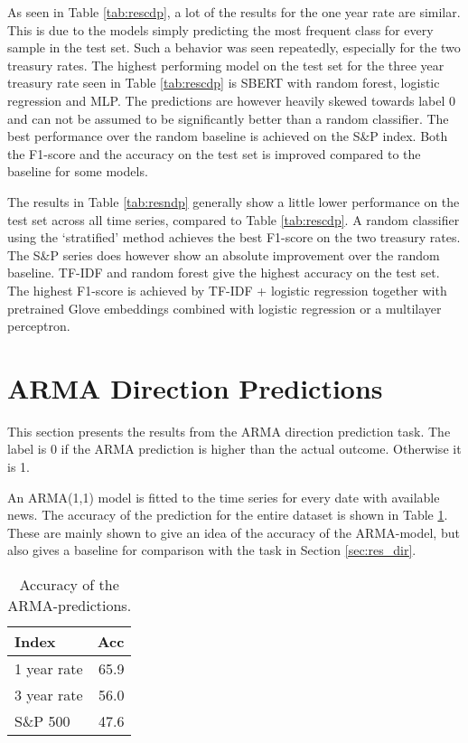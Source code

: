 As seen in Table \ref{tab:rescdp}, a lot of the results for the one year rate are similar. This is due to the models simply predicting the most frequent class for every sample in the test set. Such a behavior was seen repeatedly, especially for the two treasury rates. The highest performing model on the test set for the three year treasury rate seen in Table \ref{tab:rescdp} is SBERT with random forest, logistic regression and MLP. The predictions are however heavily skewed towards label 0 and can not be assumed to be significantly better than a random classifier.
The best performance over the random baseline is achieved on the S\&P index. Both the F1-score and the accuracy on the test set is improved compared to the baseline for some models. 

The results in Table \ref{tab:resndp} generally show a little lower performance on the test set across all time series, compared to Table \ref{tab:rescdp}. A random classifier using the `stratified' method achieves the best F1-score on the two treasury rates. The S\&P series does however show an absolute improvement over the random baseline. TF-IDF and random forest give the highest accuracy on the test set. The highest F1-score is achieved by TF-IDF + logistic regression together with pretrained Glove embeddings  combined with logistic regression or a multilayer perceptron. 

\section{ARMA Direction Predictions}\label{sec:res_arma}

This section presents the results from the ARMA direction prediction task. The label is 0 if the ARMA prediction is higher than the actual outcome. Otherwise it is 1. 

An ARMA(1,1) model is fitted to the time series for every date with available news. The accuracy of the prediction for the entire dataset is shown in Table \ref{tab:arma_acc}. These are mainly shown to give an idea of the accuracy of the ARMA-model, but also gives a baseline for comparison with the task in Section \ref{sec:res_dir}.

\begin{table}[!htb]
    \centering
    \begin{tabular}{lr}
         \textbf{Index} &  \textbf{Acc}\\
         \hline \hline 
         1 year rate & 65.9 \\
         3 year rate & 56.0 \\
         S\&P 500 & 47.6 \\
         \hline 
    \end{tabular}
    \caption{Accuracy of the ARMA-predictions. }
    \label{tab:arma_acc}
\end{table}

